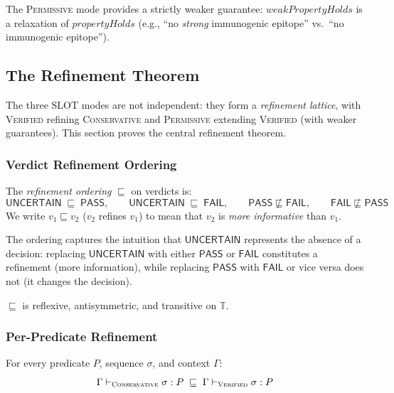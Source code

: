\documentclass[sigplan,10pt,manuscript,review,anonymous]{acmart}
\newcommand{\PASS}{\ensuremath{\mathsf{PASS}}\xspace}
\newcommand{\FAIL}{\ensuremath{\mathsf{FAIL}}\xspace}
\newcommand{\UNCERTAIN}{\ensuremath{\mathsf{UNCERTAIN}}\xspace}
\newcommand{\tvl}{\mathbb{T}}
\newcommand{\seq}{\sigma}
\newcommand{\pred}{P}
\newcommand{\verdict}{v}
\newcommand{\CONSERVATIVE}{\textsc{Conservative}\xspace}
\newcommand{\VERIFIED}{\textsc{Verified}\xspace}
\newcommand{\PERMISSIVE}{\textsc{Permissive}\xspace}
\newcommand{\evalmode}[4]{#1 \vdash_{#2} #3 : #4}
\begin{document}
The \PERMISSIVE{} mode provides a strictly weaker guarantee:
$\mathit{weakPropertyHolds}$ is a relaxation of
$\mathit{propertyHolds}$ (e.g., ``no \emph{strong} immunogenic
epitope'' vs.\ ``no immunogenic epitope'').

\subsection{The Refinement Theorem}\label{sec:refinement}

The three SLOT modes are not independent: they form a \emph{refinement
lattice}, with \VERIFIED{} refining \CONSERVATIVE{} and \PERMISSIVE{}
extending \VERIFIED{} (with weaker guarantees).
This section proves the central refinement theorem.

\subsubsection{Verdict Refinement Ordering}

\begin{definition}
The \emph{refinement ordering} $\sqsubseteq$ on verdicts is:
\[
  \UNCERTAIN \;\sqsubseteq\; \PASS,
  \qquad
  \UNCERTAIN \;\sqsubseteq\; \FAIL,
  \qquad
  \PASS \not\sqsubseteq \FAIL,
  \qquad
  \FAIL \not\sqsubseteq \PASS
\]
We write $\verdict_1 \sqsubseteq \verdict_2$ ($\verdict_2$ refines
$\verdict_1$) to mean that $\verdict_2$ is \emph{more informative}
than $\verdict_1$.
\end{definition}

The ordering captures the intuition that \UNCERTAIN{} represents the
absence of a decision: replacing \UNCERTAIN{} with either \PASS{} or
\FAIL{} constitutes a refinement (more information), while replacing
\PASS{} with \FAIL{} or vice versa does not (it changes the decision).

\begin{lemma}\label{lem:po}
$\sqsubseteq$ is reflexive, antisymmetric, and transitive on $\tvl$.
\end{lemma}

\subsubsection{Per-Predicate Refinement}

\begin{theorem}\label{thm:pred-refine}
For every predicate $\pred$, sequence $\seq$, and context $\Gamma$:
\[
  \evalmode{\Gamma}{\CONSERVATIVE}{\seq}{\pred}
  \;\sqsubseteq\;
  \evalmode{\Gamma}{\VERIFIED}{\seq}{\pred}
\]
\end{theorem}
\end{document}

